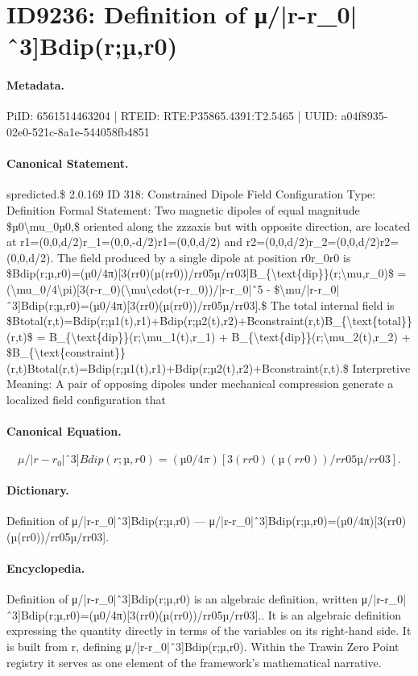 \section*{ID9236: Definition of μ/|r-r\_0|ˆ3]Bdip(r;µ,r0)}
\paragraph{Metadata.}
PiID: 6561514463204 | RTEID: RTE:P35865.4391:T2.5465 | UUID: a04f8935-02e0-521c-8a1e-544058fb4851

\paragraph{Canonical Statement.}
spredicted.\$ 2.0.169 ID 318: Constrained Dipole Field Configuration Type: Definition Formal Statement: Two magnetic dipoles of equal magnitude \$µ0\textbackslash{}mu\_0µ0,\$ oriented along the zzzaxis but with opposite direction, are located at r1=(0,0,d/2)r\_1=(0,0,-d/2)r1=(0,0,d/2) and r2=(0,0,d/2)r\_2=(0,0,d/2)r2=(0,0,d/2). The field produced by a single dipole at position r0r\_0r0 is \$Bdip(r;µ,r0)=(µ0/4π)[3(rr0)(µ(rr0))/rr05µ/rr03]B\_\{\textbackslash{}text\{dip\}\}(r;\textbackslash{}mu,r\_0)\$ = (\textbackslash{}mu\_0/4\textbackslash{}pi)[3(r-r\_0)(\textbackslash{}mu\textbackslash{}cdot(r-r\_0))/|r-r\_0|ˆ5 - \$\textbackslash{}mu/|r-r\_0|ˆ3]Bdip(r;µ,r0)=(µ0/4π)[3(rr0)(µ(rr0))/rr05µ/rr03].\$ The total internal field is \$Btotal(r,t)=Bdip(r;µ1(t),r1)+Bdip(r;µ2(t),r2)+Bconstraint(r,t)B\_\{\textbackslash{}text\{total\}\}(r,t)\$ = B\_\{\textbackslash{}text\{dip\}\}(r;\textbackslash{}mu\_1(t),r\_1) + B\_\{\textbackslash{}text\{dip\}\}(r;\textbackslash{}mu\_2(t),r\_2) + \$B\_\{\textbackslash{}text\{constraint\}\}(r,t)Btotal(r,t)=Bdip(r;µ1(t),r1)+Bdip(r;µ2(t),r2)+Bconstraint(r,t).\$ Interpretive Meaning: A pair of opposing dipoles under mechanical compression generate a localized field configuration that

\paragraph{Canonical Equation.}
\[
\mu/|r-r_0|ˆ3]Bdip(r;µ,r0)=(µ0/4π)[3(rr0)(µ(rr0))/rr05µ/rr03].
\]

\paragraph{Dictionary.}
Definition of μ/|r-r\_0|ˆ3]Bdip(r;µ,r0) — μ/|r-r\_0|ˆ3]Bdip(r;µ,r0)=(µ0/4π)[3(rr0)(µ(rr0))/rr05µ/rr03].

\paragraph{Encyclopedia.}
Definition of μ/|r-r\_0|ˆ3]Bdip(r;µ,r0) is an algebraic definition, written μ/|r-r\_0|ˆ3]Bdip(r;µ,r0)=(µ0/4π)[3(rr0)(µ(rr0))/rr05µ/rr03].. It is an algebraic definition expressing the quantity directly in terms of the variables on its right-hand side. It is built from r, defining μ/|r-r\_0|ˆ3]Bdip(r;µ,r0). Within the Trawin Zero Point registry it serves as one element of the framework's mathematical narrative.
